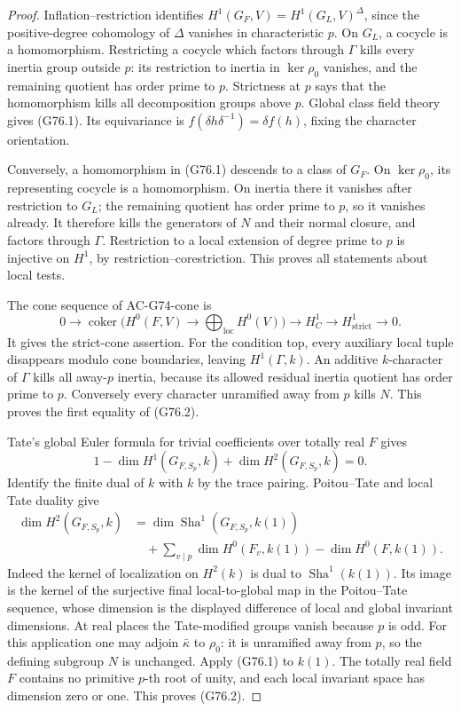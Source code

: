 \begin{proof}
Inflation--restriction identifies
\(H^1(G_F,V)=H^1(G_L,V)^\Delta\), since the positive-degree cohomology of \(\Delta\) vanishes in characteristic \(p\). On \(G_L\), a cocycle is a homomorphism. Restricting a cocycle which factors through \(\Gamma\) kills every inertia group outside \(p\): its restriction to inertia in \(\ker\rho_0\) vanishes, and the remaining quotient has order prime to \(p\). Strictness at \(p\) says that the homomorphism kills all decomposition groups above \(p\). Global class field theory gives (G76.1). Its equivariance is
\(f(\delta h\delta^{-1})=\delta f(h)\), fixing the character orientation.

Conversely, a homomorphism in (G76.1) descends to a class of \(G_F\). On \(\ker\rho_0\), its representing cocycle is a homomorphism. On inertia there it vanishes after restriction to \(G_L\); the remaining quotient has order prime to \(p\), so it vanishes already. It therefore kills the generators of \(N\) and their normal closure, and factors through \(\Gamma\). Restriction to a local extension of degree prime to \(p\) is injective on \(H^1\), by restriction--corestriction. This proves all statements about local tests.

The cone sequence of AC-G74-cone is
\[
 0\longrightarrow
 \operatorname{coker}\bigl(H^0(F,V)\longrightarrow
                 \textstyle\bigoplus_{\mathrm{loc}}H^0(V)\bigr)
 \longrightarrow H^1_C
 \longrightarrow H^1_{\mathrm{strict}}\longrightarrow0.
 \tag{G76.3}
\]
It gives the strict-cone assertion. For the condition \(\mathrm{top}\), every auxiliary local tuple disappears modulo cone boundaries, leaving \(H^1(\Gamma,k)\). An additive \(k\)-character of \(\Gamma\) kills all away-\(p\) inertia, because its allowed residual inertia quotient has order prime to \(p\). Conversely every character unramified away from \(p\) kills \(N\). This proves the first equality of (G76.2).

Tate's global Euler formula for trivial coefficients over totally real \(F\) gives
\[
 1-\dim H^1(G_{F,S_p},k)+\dim H^2(G_{F,S_p},k)=0.
 \tag{G76.4}
\]
Identify the finite dual of \(k\) with \(k\) by the trace pairing. Poitou--Tate and local Tate duality give
\[
 \begin{split}
 \dim H^2(G_{F,S_p},k)
 &=\dim \operatorname{Sha}^1(G_{F,S_p},k(1))\\
 &\quad+\sum_{v\mid p}\dim H^0(F_v,k(1))
                   -\dim H^0(F,k(1)).
 \end{split}
 \tag{G76.5}
\]
Indeed the kernel of localization on \(H^2(k)\) is dual to \(\operatorname{Sha}^1(k(1))\). Its image is the kernel of the surjective final local-to-global map in the Poitou--Tate sequence, whose dimension is the displayed difference of local and global invariant dimensions. At real places the Tate-modified groups vanish because \(p\) is odd. For this application one may adjoin \(\bar\kappa\) to \(\rho_0\): it is unramified away from \(p\), so the defining subgroup \(N\) is unchanged. Apply (G76.1) to \(k(1)\). The totally real field \(F\) contains no primitive \(p\)-th root of unity, and each local invariant space has dimension zero or one. This proves (G76.2).
\end{proof}

